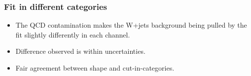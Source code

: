 \documentclass{beamer}
\begin{document}
\begin{frame}
\frametitle{Fit in different categories}
\begin{center}
\end{center}
\begin{itemize}
\scriptsize
\item The QCD contamination makes the W+jets background being pulled by the fit slightly differently in each channel.
\item Difference observed is within uncertainties.
\item Fair agreement between shape and cut-in-categories.
\end{itemize}
\end{frame}
\end{document}
